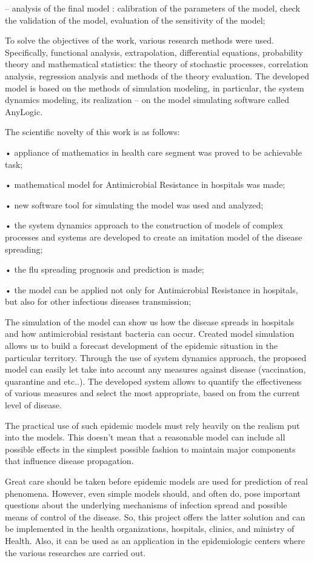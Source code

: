 –	analysis of the final model : calibration of the parameters of the model, check the validation of the model, evaluation of the sensitivity of the model;

To solve the objectives of the work, various research methods were used. Specifically, functional analysis, extrapolation, differential equations, probability theory and mathematical statistics: the theory of stochastic processes, correlation analysis, regression analysis and methods of the theory evaluation. The developed model is based on the methods of simulation modeling, in particular, the system dynamics modeling, its realization – on the model simulating software called AnyLogic.

The scientific novelty of this work is as follows:

•	appliance of mathematics in health care segment was proved to be achievable task;

•	mathematical model for Antimicrobial Resistance in hospitals was made;

•	new software tool for simulating the model was used and analyzed;

•	the system dynamics approach to the construction of models of complex processes and systems are developed to create an imitation model of the disease spreading;

•	the flu spreading prognosis and prediction is made;

•	the model can be applied not only for Antimicrobial Resistance in hospitals, but also for other infectious diseases transmission;

The simulation of the model can show us how the disease spreads in hospitals and how antimicrobial resistant bacteria can occur. Created model simulation allows us to build a forecast development of the epidemic situation in the particular territory. Through the use of system dynamics approach, the proposed model can easily let take into account any measures against disease (vaccination, quarantine and etc..). The developed system allows to quantify the effectiveness of various measures and select the most appropriate, based on from the current level of disease.

The practical use of such epidemic models must rely heavily on the realism put into the models. This doesn't mean that a reasonable model can include all possible effects in the simplest possible fashion to maintain major components that influence disease propagation.

Great care should be taken before epidemic models are used for prediction of real phenomena. However, even simple models should, and often do, pose important questions about the underlying mechanisms of infection spread and possible means of control of the disease. So, this project offers the latter solution and can be implemented in the health organizations, hospitals, clinics, and ministry of Health. Also, it can be used as an application in the epidemiologic centers where the various researches are carried out.
